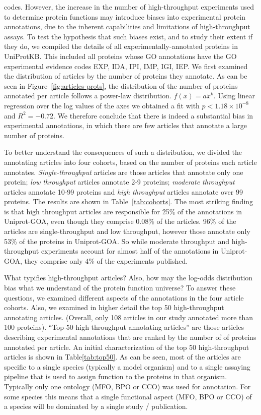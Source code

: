 \documentclass[12pt]{article}
\begin{document}
codes.  However, the increase in the number of high-throughput experiments used to determine
protein functions may introduce biases into experimental protein annotations, due to the
inherent capabilities and limitations of high-throughput assays.  To test the hypothesis
that such biases exist, and to study their extent if they do, we compiled the details of all
experimentally-annotated proteins in UniProtKB. This included all proteins whose GO
annotations have the GO experimental evidence codes EXP, IDA, IPI, IMP, IGI, IEP. We first
examined the distribution of articles by the number of proteins they annotate.  As can be
seen in Figure~\ref{fig:articles-prots}, the distribution of the number of proteins
annotated per article follows a power-law distribution. $f(x)=a\dot x^k$.  Using linear
regression over the log values of the axes we obtained a fit with $p<1.18\times 10^{-8}$ and
$R^2=-0.72$.  We therefore conclude that there is indeed a substantial bias in experimental
annotations, in which there are few articles that annotate a large number of proteins.

To better understand the consequences of such a distribution, we divided the
annotating articles into four cohorts, based on the number of proteins each article
annotates.  \textit{Single-throughput} articles are those articles that annotate
only one protein; \textit{low throughput} articles annotate 2-9 proteins;
\textit{moderate throughput} articles annotate 10-99 proteins and \textit{high
throughput} articles annotate over 99 proteins. The results are shown in
Table~\ref{tab:cohorts}. The most striking finding is that high throughput articles
are responsible for 25\% of the annotations in Uniprot-GOA, even though they
comprise 0.08\% of the articles. 96\% of the articles are single-throughput and low
throughput, however those annotate only 53\% of the proteins in Uniprot-GOA. So
while moderate throughput and high-throughput experiments account for almost half of
the annotations in Uniprot-GOA, they comprise only 4\% of the experiments published.

What typifies high-throughput articles? Also, how may the log-odds distribution bias
what we understand of the protein function universe? To answer these questions, we
examined different aspects of the annotations in the four article cohorts. Also, we
examined in higher detail the top 50 high-throughput annotating articles. (Overall,
only 108 articles in our study annotated more than 100 proteins). ``Top-50 high throughput
annotating articles'' are those articles describing experimental annotations that
are ranked by the number of of proteins annotated per article.  An initial
characterization of the top 50 high-throughput articles is shown in
Table\ref{tab:top50}. As can be seen, most of the articles are specific to a single
species (typically a model organism) and to a single assaying pipeline that is used to assign
function to the 
proteins in that organism.  Typically only one
ontology (MFO, BPO or CCO) was used for annotation. For some species this means that
a single functional aspect (MFO, BPO or CCO) of a species will be dominated by a
single study / publication.
\end{document}
